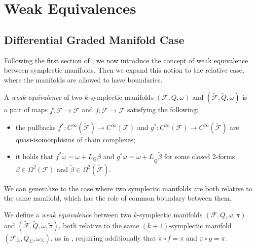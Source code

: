 \section{Weak Equivalences}
\label{sec:weak_equiv}

\subsection{Differential Graded Manifold Case}
\label{subsec:dg_mnfs_case}

Following the first section of \cite{Gluing_BV-BFV}, we now introduce the concept of weak equivalence between symplectic manifolds.
Then we expand this notion to the relative case, where the manifolds are allowed to have boundaries.

\begin{definition}
\label{def:weak_1}
    A \emph{weak equivalence} of two $k$-symplectic manifolds $(\mathcal{F}, Q, \omega)$ and $(\widetilde{\mathcal{F}}, \widetilde{Q}, \widetilde{\omega})$ is a pair of maps $f:\mathcal{F} \rightarrow \widetilde{\mathcal{F}}$ and $f:\widetilde{\mathcal{F}} \rightarrow \mathcal{F}$ satisfying the following:
    \begin{itemize}
        \item the pullbacks $f^*:C^\infty(\widetilde{\mathcal{F}}) \rightarrow C^\infty(\mathcal{F})$ and $g^*:C^\infty(\mathcal{F}) \rightarrow C^\infty(\widetilde{\mathcal{F}})$ are quasi-isomorphisms of chain complexes;
        \item it holds that $f^* \widetilde{\omega} = \omega + L_Q \beta$ and $g^* \omega = \widetilde{\omega} + L_{\widetilde{Q}} \widetilde{\beta}$ for some closed $2$-forms $\beta \in \Omega^2 (\mathcal{F})$ and $\widetilde{\beta} \in \Omega^2 (\widetilde{\mathcal{F}})$.
    \end{itemize}
\end{definition}


We can generalize  to the case where two symplectic manifolds are both relative to the same manifold, which has the role of common boundary between them.

\begin{definition}
\label{def:weak_relative}
    We define a \emph{weak equivalence} between two $k$-symplectic manifolds $(\mathcal{F}, Q, \omega, \pi)$ and $(\widetilde{\mathcal{F}}, \widetilde{Q}, \widetilde{\omega}, \widetilde{\pi})$, both relative to the same $(k+1)$-symplectic manifold $(\mathcal{F}_\Sigma, Q_\Sigma, \omega_\Sigma)$, as in , requiring additionally that $\widetilde{\pi} \circ f = \pi$ and $\pi \circ g = \widetilde{\pi}$.
\end{definition}

